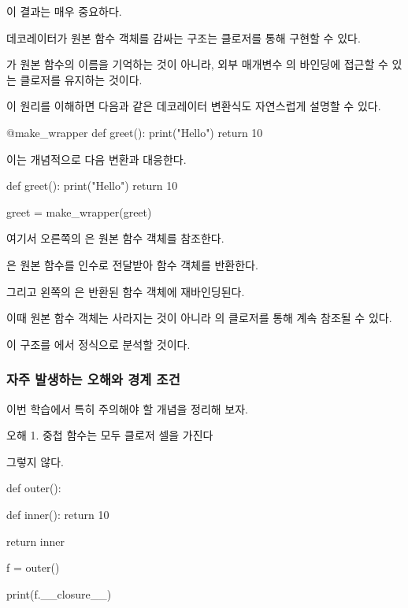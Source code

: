 이 결과는 매우 중요하다.

데코레이터가 원본 함수 객체를 감싸는 구조는 클로저를 통해 구현할 수 있다.

가 원본 함수의 이름을 기억하는 것이 아니라, 외부 매개변수 의 바인딩에 접근할 수 있는 클로저를 유지하는 것이다.

이 원리를 이해하면 다음과 같은 데코레이터 변환식도 자연스럽게 설명할 수 있다.

\begin{dhkcode}
@make_wrapper
def greet():
    print("Hello")
    return 10
\end{dhkcode}

이는 개념적으로 다음 변환과 대응한다.

\begin{dhkcode}
def greet():
    print("Hello")
    return 10


greet = make_wrapper(greet)
\end{dhkcode}

여기서 오른쪽의 은 원본 함수 객체를 참조한다.

은 원본 함수를 인수로 전달받아  함수 객체를 반환한다.

그리고 왼쪽의 은 반환된  함수 객체에 재바인딩된다.

이때 원본 함수 객체는 사라지는 것이 아니라 의 클로저를 통해 계속 참조될 수 있다.

이 구조를 에서 정식으로 분석할 것이다.

\subsubsection{자주 발생하는 오해와 경계 조건}

이번 학습에서 특히 주의해야 할 개념을 정리해 보자.

\begin{dhknote}
\begin{dhksmry}[centered]
오해 1. 중첩 함수는 모두 클로저 셀을 가진다
\end{dhksmry}
\end{dhknote}

그렇지 않다.

\begin{dhkcode}
def outer():

    def inner():
        return 10

    return inner


f = outer()

print(f.__closure__)
\end{dhkcode}

